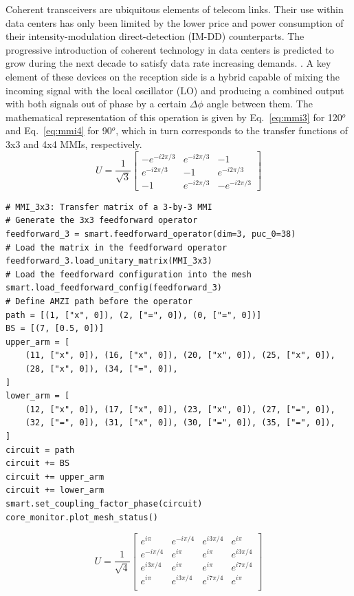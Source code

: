 Coherent transceivers are ubiquitous elements of telecom links.
Their use within data centers has only been limited by the lower price and power consumption of their intensity-modulation direct-detection (IM-DD) counterparts.
The progressive introduction of coherent technology in data centers is predicted to grow during the next decade to satisfy data rate increasing demands.
\cite{maharry_first_2022}.
A key element of these devices on the reception side is a hybrid capable of mixing the incoming signal with the local oscillator (LO) and producing a combined output with both signals out of phase by a certain $\Delta\phi$ angle between them.
The mathematical representation of this operation is given by Eq.~\eqref{eq:mmi3} for 120$^o$ and Eq.~\eqref{eq:mmi4} for 90$^o$, which in turn corresponds to the transfer functions of 3x3 and 4x4 MMIs, respectively.
\begin{equation}\label{eq:mmi3}
	U = \frac{1}{\sqrt{3}}
	\begin{bmatrix}
		-e^{-i2\pi/3} & e^{-i2\pi/3} & -1             \\
		e^{-i2\pi/3}  & -1           & e^{-i2\pi/3}   \\
		-1            & e^{-i2\pi/3} & - e^{-i2\pi/3}
	\end{bmatrix}
\end{equation}

\begin{lstlisting}[caption={Implementation of a 120$^o$ hybrid using a Feedforward operator},
label={lst:ch4-120-hybrid}]
# MMI_3x3: Transfer matrix of a 3-by-3 MMI
# Generate the 3x3 feedforward operator
feedforward_3 = smart.feedforward_operator(dim=3, puc_0=38)
# Load the matrix in the feedforward operator
feedforward_3.load_unitary_matrix(MMI_3x3)
# Load the feedforward configuration into the mesh
smart.load_feedforward_config(feedforward_3)	
# Define AMZI path before the operator
path = [(1, ["x", 0]), (2, ["=", 0]), (0, ["=", 0])]
BS = [(7, [0.5, 0])]
upper_arm = [
    (11, ["x", 0]), (16, ["x", 0]), (20, ["x", 0]), (25, ["x", 0]),
    (28, ["x", 0]), (34, ["=", 0]),
]
lower_arm = [
    (12, ["x", 0]), (17, ["x", 0]), (23, ["x", 0]), (27, ["=", 0]), 
    (32, ["=", 0]), (31, ["x", 0]), (30, ["=", 0]), (35, ["=", 0]),
]
circuit = path
circuit += BS
circuit += upper_arm
circuit += lower_arm
smart.set_coupling_factor_phase(circuit)
core_monitor.plot_mesh_status()
\end{lstlisting}

\begin{equation}\label{eq:mmi4}
	U = \frac{1}{\sqrt{4}}
	\begin{bmatrix}
		e^{i\pi}    & e^{-i\pi/4} & e^{i3\pi/4} & e^{i\pi}    \\
		e^{-i\pi/4} & e^{i\pi}    & e^{i\pi}    & e^{i3\pi/4} \\
		e^{i3\pi/4} & e^{i\pi}    & e^{i\pi}    & e^{i7\pi/4} \\
		e^{i\pi}    & e^{i3\pi/4} & e^{i7\pi/4} & e^{i\pi}    \\
	\end{bmatrix}
\end{equation}

